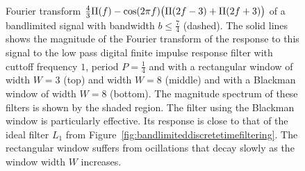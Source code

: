 \begin{figure}[p]

  \caption{Fourier transform $\tfrac{4}{3}\Pi(f) - \cos(2\pi f) \big( \Pi(2f - 3) + \Pi(2f + 3) \big)$ of a bandlimited signal with bandwidth $b \leq \tfrac{7}{4}$ (dashed). The solid lines shows the magnitude of the Fourier transform of the response to this signal to the low pass digital finite impulse response filter with cuttoff frequency $1$, period $P = \tfrac{1}{4}$ and with a rectangular window of width $W=3$ (top) and width $W=8$ (middle) and with a Blackman window of width $W = 8$ (bottom).  The magnitude spectrum of these filters is shown by the shaded region. The filter using the Blackman window is particularly effective.  Its response is close to that of the ideal filter $L_1$ from Figure~\ref{fig:bandlimiteddiscretetimefiltering}.  The rectangular window suffers from ocillations that decay slowly as the window width $W$ increases.} \label{fig:bandlimiteddiscretetimefilteringW3}
\end{figure}


